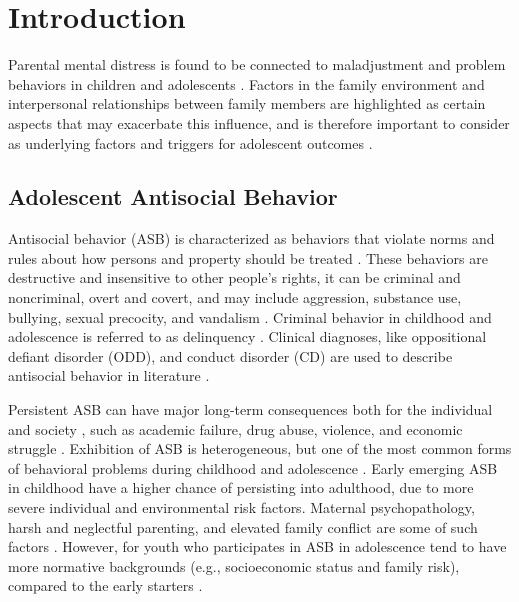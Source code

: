 \documentclass{sn-jnl}                  %
\begin{document}

\maketitle

\section{Introduction}

Parental mental distress is found to be connected to maladjustment and problem behaviors in children and adolescents \citep{elgar:2007, joyner:2021}. Factors in the family environment and interpersonal relationships between family members are highlighted as certain aspects that may exacerbate this influence, and is therefore important to consider as underlying factors and triggers for adolescent outcomes \citep{vanloon:2014, xu:2017}.

\subsection{Adolescent Antisocial Behavior}

Antisocial behavior (ASB) is characterized as behaviors that violate norms and rules about how persons and property should be treated \citep{scott:2015}. These behaviors are destructive and insensitive to other people's rights, it can be criminal and noncriminal, overt and covert, and may include aggression, substance use, bullying, sexual precocity, and vandalism \citep{dishion:2006}. Criminal behavior in childhood and adolescence is referred to as delinquency \citep{hiatt:2008}. Clinical diagnoses, like oppositional defiant disorder (ODD), and conduct disorder (CD) are used to describe antisocial behavior in literature \citep{fonagy:2021}.

Persistent ASB can have major long-term consequences both for the individual and society \citep{lobraico:2020}, such as academic failure, drug abuse, violence, and economic struggle \citep{moffitt:2001, moffitt:2018}. Exhibition of ASB is heterogeneous, but one of the most common forms of behavioral problems during childhood and adolescence \citep{frick:2009}. Early emerging ASB in childhood have a higher chance of persisting into adulthood, due to more severe individual and environmental risk factors. Maternal psychopathology, harsh and neglectful parenting, and elevated family conflict are some of such factors \citep{dishion:2006, moffitt:2015}. However, for youth who participates in ASB in adolescence tend to have more normative backgrounds (e.g., socioeconomic status and family risk), compared to the early starters \citep{moffitt:2001}.
\end{document}

